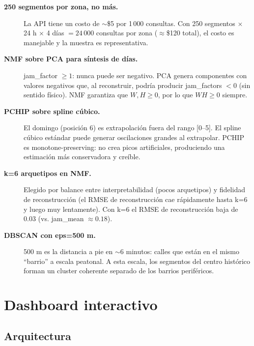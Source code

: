 \documentclass[12pt,a4paper]{article}
\begin{document}
\begin{description}
  \item[\textbf{250 segmentos por zona, no más.}]
    La API tiene un costo de $\sim$\$5 por 1\,000 consultas.
    Con 250 segmentos $\times$ 24 h $\times$ 4 días $= 24\,000$ consultas por zona
    ($\approx$\$120 total), el costo es manejable y la muestra es representativa.

  \item[\textbf{NMF sobre PCA para síntesis de días.}]
    jam\_factor $\geq 1$: nunca puede ser negativo.
    PCA genera componentes con valores negativos que, al reconstruir,
    podría producir jam\_factors $< 0$ (sin sentido físico).
    NMF garantiza que $W, H \geq 0$, por lo que $WH \geq 0$ siempre.

  \item[\textbf{PCHIP sobre spline cúbico.}]
    El domingo (posición 6) es extrapolación fuera del rango [0--5].
    El spline cúbico estándar puede generar oscilaciones grandes al
    extrapolar. PCHIP es monotone-preserving: no crea picos artificiales,
    produciendo una estimación más conservadora y creíble.

  \item[\textbf{k=6 arquetipos en NMF.}]
    Elegido por balance entre interpretabilidad (pocos arquetipos) y
    fidelidad de reconstrucción (el RMSE de reconstrucción cae rápidamente
    hasta k=6 y luego muy lentamente). Con k=6 el RMSE de reconstrucción
    baja de 0.03 (vs. jam\_mean $\approx 0.18$).

  \item[\textbf{DBSCAN con eps=500 m.}]
    500 m es la distancia a pie en $\sim$6 minutos: calles que están
    en el mismo ``barrio'' a escala peatonal.
    A esta escala, los segmentos del centro histórico forman un cluster
    coherente separado de los barrios periféricos.
\end{description}

\section{Dashboard interactivo}

\subsection{Arquitectura}
\end{document}

